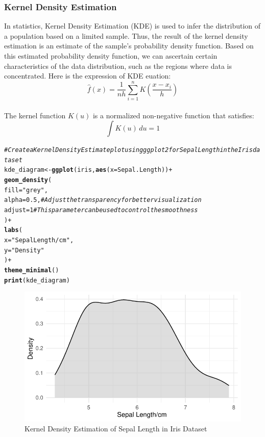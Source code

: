 \documentclass{article}\usepackage[]{graphicx}\usepackage[]{xcolor}
\makeatletter
\def\maxwidth{ %
  \ifdim\Gin@nat@width>\linewidth
    \linewidth
  \else
    \Gin@nat@width
  \fi
}
\newcommand{\hlnum}[1]{\textcolor[rgb]{0.686,0.059,0.569}{#1}}%
\newcommand{\hlstr}[1]{\textcolor[rgb]{0.192,0.494,0.8}{#1}}%
\newcommand{\hlcom}[1]{\textcolor[rgb]{0.678,0.584,0.686}{\textit{#1}}}%
\newcommand{\hlopt}[1]{\textcolor[rgb]{0,0,0}{#1}}%
\newcommand{\hlstd}[1]{\textcolor[rgb]{0.345,0.345,0.345}{#1}}%
\newcommand{\hlkwb}[1]{\textcolor[rgb]{0.69,0.353,0.396}{#1}}%
\newcommand{\hlkwc}[1]{\textcolor[rgb]{0.333,0.667,0.333}{#1}}%
\newcommand{\hlkwd}[1]{\textcolor[rgb]{0.737,0.353,0.396}{\textbf{#1}}}%
\newenvironment{kframe}{%
 \def\at@end@of@kframe{}%
 \ifinner\ifhmode%
  \def\at@end@of@kframe{\end{minipage}}%
  \begin{minipage}{\columnwidth}%
 \fi\fi%
 \def\FrameCommand##1{\hskip\@totalleftmargin \hskip-\fboxsep
 \colorbox{shadecolor}{##1}\hskip-\fboxsep
     \hskip-\linewidth \hskip-\@totalleftmargin \hskip\columnwidth}%
 \MakeFramed {\advance\hsize-\width
   \@totalleftmargin\z@ \linewidth\hsize
   \@setminipage}}%
 {\par\unskip\endMakeFramed%
 \at@end@of@kframe}
\newenvironment{knitrout}{}{} %
\makeatother
\begin{document}
\subsubsection{Kernel Density Estimation}
In statistics, Kernel Density Estimation (KDE) is used to infer the distribution of a population based on a limited sample. Thus, the result of the kernel density estimation is an estimate of the sample's probability density function. Based on this estimated probability density function, we can ascertain certain characteristics of the data distribution, such as the regions where data is concentrated.
Here is the expression of KDE euation:
$$\hat{f}(x) = \frac{1}{nh} \sum_{i=1}^{n} K\left(\frac{x - x_i}{h}\right)$$\\
The kernel function \( K(u) \) is a normalized non-negative function that satisfies:
\[ \int K(u) \, du = 1 \]
\begin{knitrout}\scriptsize
{}\color{fgcolor}\begin{kframe}
\begin{alltt}
\hlcom{# Create a Kernel Density Estimate plot using ggplot2 for Sepal Length in the Iris dataset}
\hlstd{kde_diagram} \hlkwb{<-} \hlkwd{ggplot}\hlstd{(iris,} \hlkwd{aes}\hlstd{(}\hlkwc{x} \hlstd{= Sepal.Length))} \hlopt{+}
  \hlkwd{geom_density}\hlstd{(}
    \hlkwc{fill} \hlstd{=} \hlstr{"grey"}\hlstd{,}
    \hlkwc{alpha} \hlstd{=} \hlnum{0.5}\hlstd{,}  \hlcom{# Adjust the transparency for better visualization}
    \hlkwc{adjust} \hlstd{=} \hlnum{1}  \hlcom{# This parameter can be used to control the smoothness}
  \hlstd{)} \hlopt{+}
  \hlkwd{labs}\hlstd{(}
    \hlkwc{x} \hlstd{=} \hlstr{"Sepal Length/cm"}\hlstd{,}
    \hlkwc{y} \hlstd{=} \hlstr{"Density"}
  \hlstd{)} \hlopt{+}
  \hlkwd{theme_minimal}\hlstd{()}
\hlkwd{print}\hlstd{(kde_diagram)}
\end{alltt}
\end{kframe}\begin{figure}[H]

{\centering \includegraphics[width=\maxwidth]{figure/beamer-kde3-1} 

}

\caption[Kernel Density Estimation of Sepal Length in Iris Dataset]{Kernel Density Estimation of Sepal Length in Iris Dataset}\label{fig:kde3}
\end{figure}

\end{knitrout}
\end{document}
